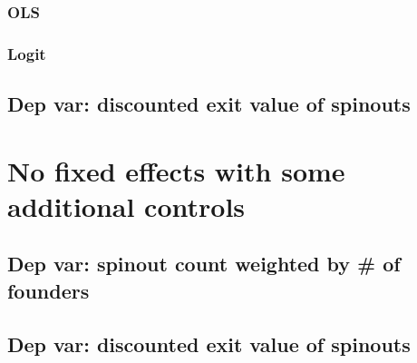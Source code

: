\documentclass[12pt,english]{article}
\theoremstyle{remark}
\begin{document}
\subsubsection{OLS}

\linebreak

\linebreak

\linebreak

\linebreak

\linebreak

\linebreak

\linebreak

\linebreak

\linebreak


\subsubsection{Logit}

\linebreak

\linebreak


\subsection{Dep var: discounted exit value of spinouts}

 

\section{No fixed effects with some additional controls}

\subsection{Dep var: spinout count weighted by \# of founders}



\subsection{Dep var: discounted exit value of spinouts}
\end{document}
